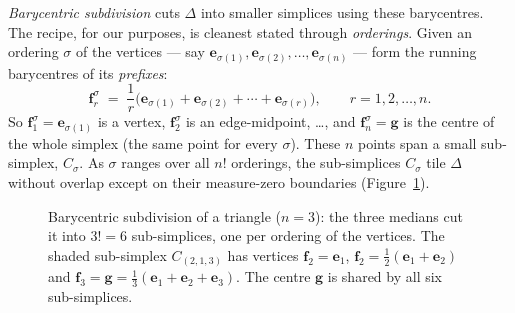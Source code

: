 \documentclass[11pt,a4paper]{article}
\theoremstyle{definition}
\theoremstyle{plain}
\newcommand{\bvec}[1]{\mathbf{#1}}
\begin{document}
\emph{Barycentric subdivision} cuts $\Delta$ into smaller simplices using these
barycentres. The recipe, for our purposes, is cleanest stated through
\emph{orderings}. Given an ordering $\sigma$ of the vertices --- say
$\bvec e_{\sigma(1)},\bvec e_{\sigma(2)},\dots,\bvec e_{\sigma(n)}$ --- form the
running barycentres of its \emph{prefixes}:
\begin{equation}\label{eq:facebary}
   \bvec f^{\sigma}_r \;=\; \frac1r\bigl(\bvec e_{\sigma(1)}+\bvec e_{\sigma(2)}
            +\cdots+\bvec e_{\sigma(r)}\bigr),
   \qquad r=1,2,\dots,n .
\end{equation}
So $\bvec f^\sigma_1=\bvec e_{\sigma(1)}$ is a vertex, $\bvec f^\sigma_2$ is an
edge-midpoint, \dots, and $\bvec f^\sigma_n=\bvec g$ is the centre of the whole
simplex (the same point for every $\sigma$). These $n$ points span a small
sub-simplex, $C_\sigma$. As $\sigma$ ranges over all $n!$ orderings,
the sub-simplices $C_\sigma$ tile $\Delta$ without overlap except on their measure-zero boundaries (Figure~\ref{fig:sd}).

\begin{figure}[h]
\centering
{}
\caption{Barycentric subdivision of a triangle ($n=3$): the three medians cut it
into $3!=6$ sub-simplices, one per ordering of the vertices. The shaded sub-simplex
$C_{(2,1,3)}$ has vertices $\bvec f_2=\bvec e_1$, $\bvec f_2=\tfrac12(\bvec
e_1{+}\bvec e_2)$ and $\bvec f_3=\bvec g=\tfrac13(\bvec e_1{+}\bvec e_2{+}\bvec
e_3)$. The centre $\bvec g$ is shared by all six sub-simplices.}
\label{fig:sd}
\end{figure}
\end{document}
